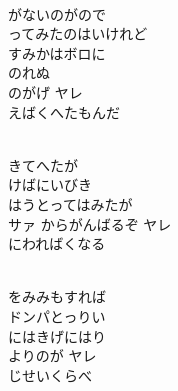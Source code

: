 \documentclass[10pt,b5j]{tarticle} %
\begin{document}
\vspace{1.5em} %
\newcommand{\linespace}{0.5em} %
\newcommand{\blocksize}{0.5\hsize} %
\newcommand{\itemmargin}{6em} %
\begin{enumerate} %
    \setlength{\itemindent}{\itemmargin} %
    \begin{minipage}[c]{\blocksize}
    
        \vspace{\linespace}
        \item~\\
        がないのがので\\
        ってみたのはいけれど\\
        すみかはボロに\\
        のれぬ\\
        のがげ ヤレ\\
        えばくへたもんだ
        
        \vspace{\linespace}
        \item~\\
        きてへたが\\
        けばにいびき\\
        はうとってはみたが\\
        サァ からがんばるぞ ヤレ\\
        にわればくなる
        
        \vspace{\linespace}
        \item~\\
        をみみもすれば\\
        ドンパとっりい\\
        にはきげにはり\\
        よりのが ヤレ\\
        じせいくらべ
        

\end{minipage}
\end{enumerate}
\end{document}
